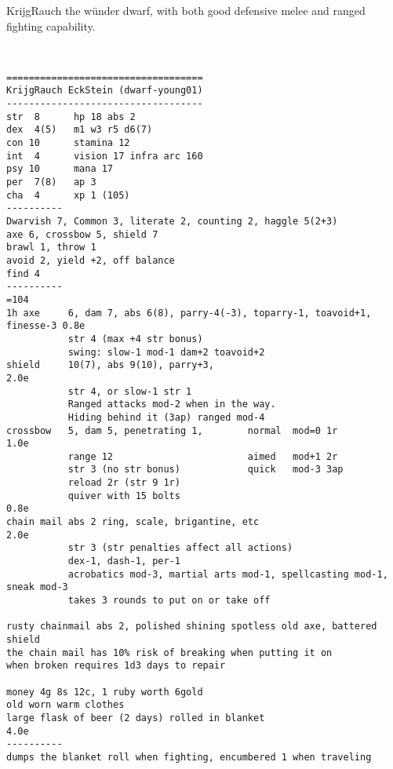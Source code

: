 \clearpage
\begin{samepage}

\noindent KrijgRauch the wünder dwarf, with both good defensive melee and ranged fighting capability.

\

\small \begin{verbatim}
===================================
KrijgRauch EckStein (dwarf-young01)
-----------------------------------
str  8      hp 18 abs 2
dex  4(5)   m1 w3 r5 d6(7)
con 10      stamina 12
int  4      vision 17 infra arc 160
psy 10      mana 17
per  7(8)   ap 3
cha  4      xp 1 (105)
----------
Dwarvish 7, Common 3, literate 2, counting 2, haggle 5(2+3)
axe 6, crossbow 5, shield 7
brawl 1, throw 1
avoid 2, yield +2, off balance
find 4
----------                                                                  =104
1h axe     6, dam 7, abs 6(8), parry-4(-3), toparry-1, toavoid+1, finesse-3 0.8e
           str 4 (max +4 str bonus)
           swing: slow-1 mod-1 dam+2 toavoid+2
shield     10(7), abs 9(10), parry+3,                                       2.0e
           str 4, or slow-1 str 1
           Ranged attacks mod-2 when in the way.
           Hiding behind it (3ap) ranged mod-4
crossbow   5, dam 5, penetrating 1,        normal  mod=0 1r                 1.0e
           range 12                        aimed   mod+1 2r
           str 3 (no str bonus)            quick   mod-3 3ap
           reload 2r (str 9 1r)
           quiver with 15 bolts                                             0.8e
chain mail abs 2 ring, scale, brigantine, etc                               2.0e
           str 3 (str penalties affect all actions)
           dex-1, dash-1, per-1
           acrobatics mod-3, martial arts mod-1, spellcasting mod-1, sneak mod-3
           takes 3 rounds to put on or take off

rusty chainmail abs 2, polished shining spotless old axe, battered shield
the chain mail has 10% risk of breaking when putting it on
when broken requires 1d3 days to repair

money 4g 8s 12c, 1 ruby worth 6gold
old worn warm clothes
large flask of beer (2 days) rolled in blanket                              4.0e
----------
dumps the blanket roll when fighting, encumbered 1 when traveling
\end{verbatim} \end{samepage} \normalsize






